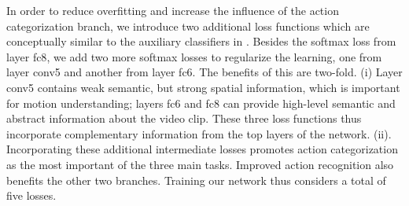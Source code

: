 \documentclass[10pt,twocolumn,letterpaper]{article}
\begin{document}
In order to reduce overfitting and increase the influence of the action categorization branch, we introduce two additional loss functions which are conceptually similar to the auxiliary classifiers in \cite{inception_v3_2015}. Besides the softmax loss from layer \textsf{fc8}, we add two more softmax losses to regularize the learning, one from layer \textsf{conv5} and another from layer \textsf{fc6}. The benefits of this are two-fold. 
(i) Layer \textsf{conv5} contains weak semantic, but strong spatial information, which is important for motion understanding; layers \textsf{fc6} and \textsf{fc8} can provide high-level semantic and abstract information about the video clip. These three loss functions thus incorporate complementary information from the top layers of the network. 
(ii). Incorporating these additional intermediate losses promotes action categorization as the most important of the three main tasks.
Improved action recognition also benefits the other two branches. 
Training our network thus considers a total of five losses.

\end{document}
